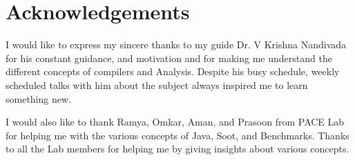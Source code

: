 \chapter{Acknowledgements}

I would like to express my sincere thanks to my guide Dr. V Krishna Nandivada for his constant guidance, and motivation and for making me understand the different concepts of compilers and Analysis. Despite his busy schedule, weekly scheduled talks with him about the subject always inspired me to learn something new.

I would also like to thank Ramya, Omkar, Aman, and Prasoon from PACE Lab for helping me with the various concepts of Java, Soot, and Benchmarks. Thanks to all the Lab members for helping me by giving insights about various concepts.